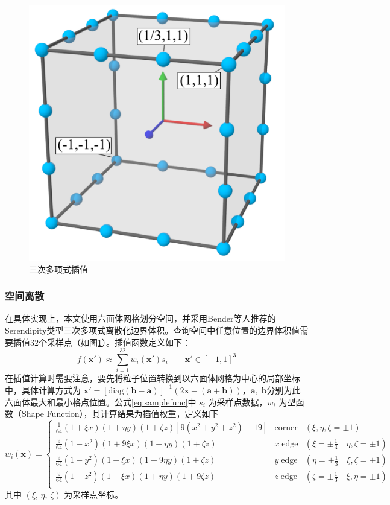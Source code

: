     \begin{figure}
    	\centering
    	\includegraphics[width=.4\textwidth]{figures/simulation/sample.png}
    	\caption{三次多项式插值}
    	\label{fig:cubicsample}
    \end{figure}

\subsubsection{空间离散}
    在具体实现上，本文使用六面体网格划分空间，并采用Bender等人\cite{BKW19SPHB}推荐的Serendipity类型三次多项式离散化边界体积。查询空间中任意位置的边界体积值需要插值32个采样点（如图\ref{fig:cubicsample}）。插值函数定义如下：
    \begin{equation}\label{eq:samplefunc}
    	f(\mathbf x') \approx \sum_{i=1}^{32} w_i(\mathbf x') s_i \qquad \mathbf x' \in [-1,1]^3 
    \end{equation}
    在插值计算时需要注意，要先将粒子位置转换到以六面体网格为中心的局部坐标中，具体计算方式为 $\mathbf x' = [\mathrm{diag}(\mathbf b - \mathbf a)]^{-1}(2\mathbf x -(\mathbf a + \mathbf b))$，$\mathbf a,\; \mathbf b$分别为此六面体最大和最小格点位置。公式\ref{eq:samplefunc}中 $s_i$ 为采样点数据，$w_i$ 为型函数（Shape Function），其计算结果为插值权重，定义如下
    \begin{equation}
    	w_i(\mathbf x) =
    	\left\{
    	\begin{array}{lll}
    
    	\frac{1}{64} (1 + \xi x)(1 + \eta y)(1 + \zeta z) \left[ 9(x^2 + y^2 + z^2)-19 \right] 
    	& \mathrm{corner} & (\xi,\eta,\zeta=\pm 1) \\
    
    	\frac{9}{64} (1 - x^2) (1 + 9 \xi x) (1 + \eta y) (1 + \zeta z)
    	& x\; \mathrm{edge} & (\xi=\pm \frac{1}{3} \quad \eta,\zeta=\pm 1) \\
    
    	\frac{9}{64} (1 - y^2) (1 + \xi x) (1 + 9 \eta y) (1 + \zeta z)
    	& y\; \mathrm{edge} & (\eta=\pm \frac{1}{3} \quad \xi,\zeta=\pm 1)\\
    
    	\frac{9}{64} (1 - z^2) (1 + \xi x) (1 + \eta y) (1 + 9 \zeta z)
    	& z\; \mathrm{edge} & (\zeta=\pm \frac{1}{3} \quad \xi,\eta=\pm 1) \\
    
    	\end{array}
    	\right.
    \end{equation}
    其中 $(\xi,\,\eta,\,\zeta)$ 为采样点坐标。
    
